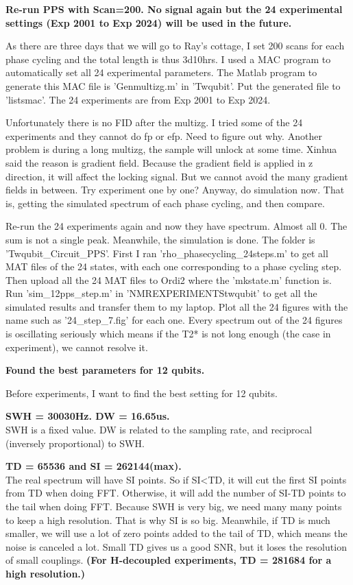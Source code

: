 {}

\textbf{Re-run PPS with Scan=200. No signal again but the 24 experimental settings (Exp 2001 to Exp 2024) will be used in the future.}

As there are three days that we will go to Ray's cottage, I set 200 scans for each phase cycling and the total length is thus 3d10hrs. I used a MAC program to automatically set all 24 experimental parameters. The Matlab program to generate this MAC file is 'Genmultizg.m' in '\dir Twqubit\dir'. Put the generated file to '\dir lists\dir mac\dir'. The 24 experiments are from Exp 2001 to Exp 2024.

Unfortunately there is no FID after the multizg. I tried some of the 24 experiments and they cannot do fp or efp. Need to figure out why. Another problem is during a long multizg, the sample will unlock at some time. Xinhua said the reason is gradient field. Because the gradient field is applied in z direction, it will affect the locking signal. But we cannot avoid the many gradient fields in between. Try experiment one by one? Anyway, do simulation now. That is, getting the simulated spectrum of each phase cycling, and then compare.

Re-run the 24 experiments again and now they have spectrum. Almost all 0. The sum is not a single peak. Meanwhile, the simulation is done. The folder is '\dir Twqubit\_Circuit\_PPS\dir'. First I ran 'rho\_phasecycling\_24steps.m' to get all MAT files of the 24 states, with each one corresponding to a phase cycling step. Then upload all the 24 MAT files to Ordi2 where the 'mkstate.m' function is. Run 'sim\_12pps\_step.m' in '\dir NMR\dir EXPERIMENTS\dir twqubit' to get all the simulated results and transfer them to my laptop. Plot all the 24 figures with the name such as '24\_step\_7.fig' for each one. Every spectrum out of the 24 figures is oscillating seriously which means if the T2* is not long enough (the case in experiment), we cannot resolve it.

{}

\textbf{Found the best parameters for 12 qubits.}

Before experiments, I want to find the best setting for 12 qubits.

\textbf{SWH = 30030Hz. DW = 16.65us. }\\
SWH is a fixed value. DW is related to the sampling rate, and reciprocal (inversely proportional) to SWH.

\textbf{TD = 65536 and SI = 262144(max).} \\
The real spectrum will have SI points. So if SI<TD, it will cut the first SI points from TD when doing FFT. Otherwise, it will add the number of SI-TD points to the tail when doing FFT. Because SWH is very big, we need many many points to keep a high resolution. That is why SI is so big. Meanwhile, if TD is much smaller, we will use a lot of zero points added to the tail of TD, which means the noise is canceled a lot. Small TD gives us a good SNR, but it loses the resolution of small couplings.
\textbf{(For H-decoupled experiments, TD = 281684 for a high resolution.)}

